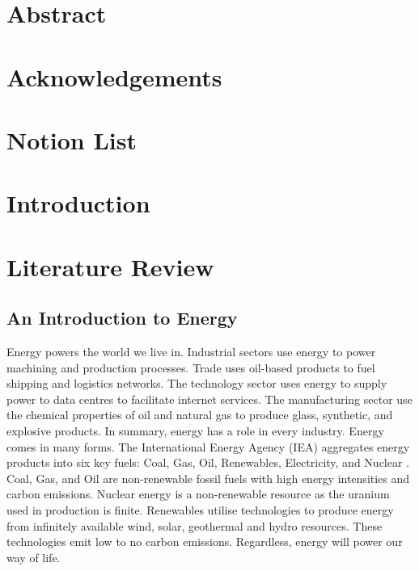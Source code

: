 \documentclass[12pt]{article}
\begin{document}
\section*{Abstract}
\newpage
\section*{Acknowledgements}
\newpage
\tableofcontents
\newpage
\section*{Notion List}
\newpage
\listoffigures
\newpage
\listoftables
\newpage
\section{Introduction}
\section{Literature Review}
\subsection{An Introduction to Energy}
	Energy powers the world we live in.
Industrial sectors use energy to power machining and production processes. Trade uses oil-based products to fuel shipping and logistics networks. 
The technology sector uses energy to supply power to data centres to facilitate internet services. The manufacturing sector use the chemical properties of oil and natural gas to produce glass, synthetic, and explosive products. 
In summary, energy has a role in every industry. Energy comes in many forms. 
The International Energy Agency (IEA) aggregates energy products into six key fuels: Coal, Gas, Oil, Renewables, Electricity, and Nuclear \cite{W:2}. 
Coal, Gas, and Oil are non-renewable fossil fuels with high energy intensities and carbon emissions. 
Nuclear energy is a non-renewable resource as the uranium used in production is finite. 
Renewables utilise technologies to produce energy from infinitely available wind, solar, geothermal and hydro resources. 
These technologies emit low to no carbon emissions. 
Regardless, energy will power our way of life.
\end{document}
